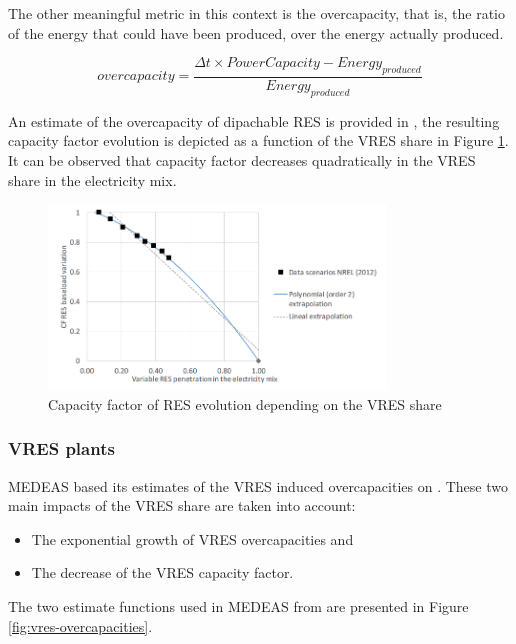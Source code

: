 The other meaningful metric in this context is the overcapacity, that is, the ratio of the energy that could have been produced, over the energy actually produced. %

\begin{equation}
    overcapacity = \frac{\Delta t \times PowerCapacity - Energy_{produced}}{Energy_{produced}}
    \label{equation:overcapacity}
\end{equation}

An estimate of the overcapacity of dipachable RES is provided in \cite{NREL}, the resulting capacity factor evolution is depicted as a function of the VRES share in Figure \ref{fig:cfres-vreshare}. It can be observed that capacity factor decreases quadratically in the VRES share in the electricity mix.

\begin{figure}[h]
    \includegraphics[width=0.8\textwidth]{resources/images/cfres-vreshsare.png}
    \caption{Capacity factor of RES evolution depending on the VRES share \cite{NREL}}
    \label{fig:cfres-vreshare}
\end{figure}

\subsubsection{VRES plants}

MEDEAS based its estimates of the VRES induced overcapacities on \cite{delarue}. These two main impacts of the VRES share are taken into account:
\begin{itemize}
    \item The exponential growth of VRES overcapacities and
    \item The decrease of the VRES capacity factor.
\end{itemize}

The two estimate functions used in MEDEAS \cite{medeas-eroi} from \cite{delarue} are presented in Figure \ref{fig:vres-overcapacities}.

